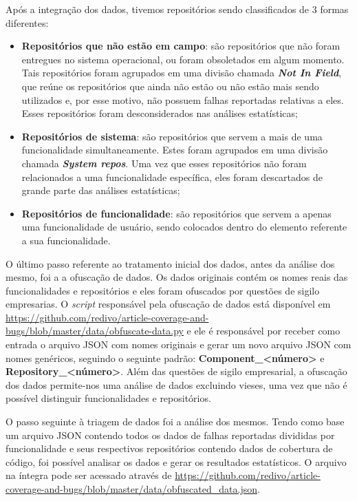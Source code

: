 \documentclass[11.5pt]{article}
\begin{document}
Após a integração dos dados, tivemos repositórios sendo classificados de 3 formas diferentes:
\begin{itemize}
    \item \textbf{Repositórios que não estão em campo}:
          são repositórios que não foram entregues no sistema operacional, ou foram obsoletados em
          algum momento. Tais repositórios foram agrupados em uma divisão chamada
          \textbf{\textit{Not In Field}}, que reúne os repositórios que ainda não estão ou não estão
          mais sendo utilizados e, por esse motivo, não possuem falhas reportadas relativas a eles.
          Esses repositórios foram desconsiderados nas análises estatísticas;

    \item \textbf{Repositórios de sistema}:
          são repositórios que servem a mais de uma funcionalidade simultaneamente.
          Estes foram agrupados em uma divisão chamada \textbf{\textit{System repos}}.
          Uma vez que esses repositórios não foram relacionados a uma funcionalidade específica, eles
          foram descartados de grande parte das análises estatísticas;

    \item \textbf{Repositórios de funcionalidade}:
          são repositórios que servem a apenas uma funcionalidade de usuário, sendo colocados dentro
          do elemento referente a sua funcionalidade.
\end{itemize}

O último passo referente ao tratamento inicial dos dados, antes da análise dos mesmo, foi a
a ofuscação de dados.
Os dados originais contém os nomes reais das funcionalidades e repositórios e eles foram ofuscados
por questões de sigilo empresarias.
O \textit{script} responsável pela ofuscação de dados está disponível em
\url{https://github.com/redivo/article-coverage-and-bugs/blob/master/data/obfuscate-data.py}
e ele é responsável por receber como entrada o arquivo JSON com nomes originais e gerar um novo
arquivo JSON com nomes genéricos, seguindo o seguinte padrão:
\textbf{Component\_\textless número\textgreater} e
\textbf{Repository\_\textless número\textgreater}.
Além das questões de sigilo empresarial, a ofuscação dos dados permite-nos uma análise de dados
excluindo vieses, uma vez que não é possível distinguir funcionalidades e repositórios.

O passo seguinte à triagem de dados foi a análise dos mesmos.
Tendo como base um arquivo JSON contendo todos os dados de falhas reportadas divididas por
funcionalidade e seus respectivos repositórios contendo dados de cobertura de código, foi possível
analisar os dados e gerar os resultados estatísticos.
O arquivo na íntegra pode ser acessado através de
\url{https://github.com/redivo/article-coverage-and-bugs/blob/master/data/obfuscated_data.json}.
\end{document}
